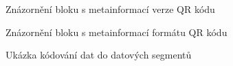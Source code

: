 \begin{figure}[H]
  \begin{center}
    \caption{Znázornění bloku s metainformací verze QR kódu}
    \label{QRCodeVersionMetainformation}
  \end{center}
\end{figure}

\begin{figure}[H]
  \begin{center}
    \caption{Znázornění bloku s metainformací formátu QR kódu}
    \label{QRCodeFormatMetainformation}
  \end{center}
\end{figure}

\begin{figure}[H]
  \begin{center}
    \caption{Ukázka kódování dat do datových segmentů}
    \label{QRCodeDataSegments}
  \end{center}
\end{figure}

